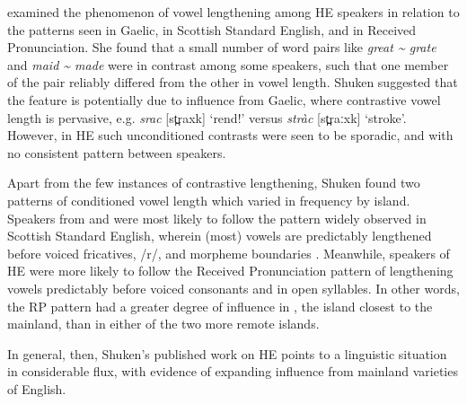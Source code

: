 \documentclass[output=paper,colorlinks,citecolor=brown]{langscibook}
\begin{document}
\citet{Shuken:1986} examined the phenomenon of vowel lengthening among HE speakers in relation to the patterns seen in Gaelic, in Scottish Standard English, and in Received Pronunciation. She found that a small number of word pairs like \textit{great {\textasciitilde} grate} and \textit{maid {\textasciitilde} made} were in contrast among some speakers, such that one member of the pair reliably differed from the other in vowel length. Shuken suggested that the feature is potentially due to influence from Gaelic, where contrastive vowel length is pervasive, e.g. \textit{srac} [st̪raxk] ‘rend!’ versus \textit{stràc} [st̪raːxk] ‘stroke’. However, in HE such unconditioned contrasts were seen to be sporadic, and with no consistent pattern between speakers. 

Apart from the few instances of contrastive lengthening, Shuken found two patterns of conditioned vowel length which varied in frequency by island. Speakers from  and  were most likely to follow the pattern widely observed in Scottish Standard English, wherein (most) vowels are predictably lengthened before voiced fricatives, /r/, and morpheme boundaries \citep{Aitken.1981}. Meanwhile,  speakers of HE were more likely to follow the Received Pronunciation pattern of lengthening vowels predictably before voiced consonants and in open syllables. In other words, the RP pattern had a greater degree of influence in , the island closest to the mainland, than in either of the two more remote islands. 

In general, then, Shuken’s published work on HE points to a linguistic situation in considerable flux, with evidence of expanding influence from mainland varieties of English. 


\subsubsection{\citet{Clayton:2015, Clayton:2017, Clayton:2018}}
\end{document}
